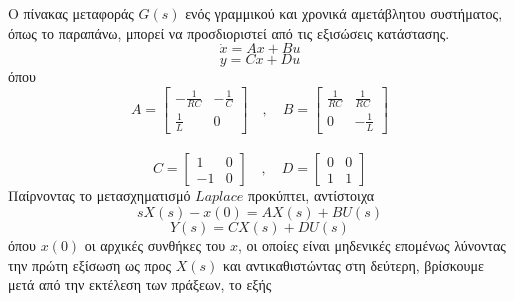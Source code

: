 \documentclass[12pt]{article}
\begin{document}
Ο πίνακας μεταφοράς $G(s)$ ενός γραμμικού και χρονικά αμετάβλητου συστήματος, όπως το παραπάνω, μπορεί να προσδιοριστεί από τις εξισώσεις κατάστασης.
\[ \dot{x} =  Ax+Bu \]
\[y=Cx+Du\]
όπου
\[A=
\begin{bmatrix}
    -\frac{1}{RC}  & -\frac{1}{C} \\
    \frac{1}{L}    & 0
\end{bmatrix}
\quad , \quad B=
\begin{bmatrix}
    \frac{1}{RC}  & \frac{1}{RC} \\
    0    & -\frac{1}{L}
\end{bmatrix}
\]
\\
\[ C=
\begin{bmatrix}
    1  & 0 \\
   -1  & 0
\end{bmatrix}
\quad , \quad D=
\begin{bmatrix}
    0  & 0 \\
    1  & 1
\end{bmatrix}
\] 
Παίρνοντας το μετασχηματισμό $Laplace$ προκύπτει, αντίστοιχα
\[sX(s)-x(0)=AX(s)+BU(s)\]
\[Y(s)=CX(s)+DU(s)\]
όπου $x(0)$ οι αρχικές συνθήκες του $x$, οι οποίες είναι μηδενικές επομένως λύνοντας την πρώτη εξίσωση ως προς $X(s)$ και αντικαθιστώντας στη δεύτερη, βρίσκουμε μετά από την εκτέλεση των πράξεων, το εξής
\\
\end{document}
